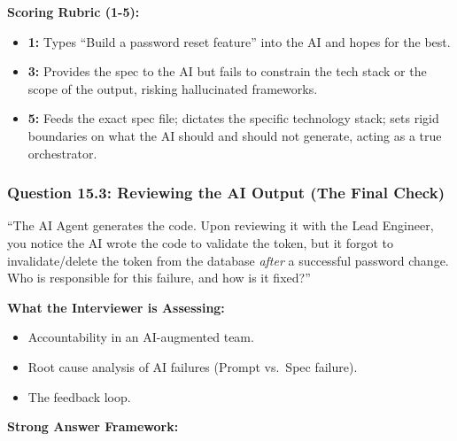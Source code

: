\documentclass[
  11pt,
  openany,
  oneside]{book}
\providecommand{\tightlist}{%
  \setlength{\itemsep}{0pt}\setlength{\parskip}{0pt}}
\begin{document}
\textbf{Scoring Rubric (1-5):}

\begin{itemize}
\tightlist
\item
  \textbf{1:} Types ``Build a password reset feature'' into the AI and
  hopes for the best.
\item
  \textbf{3:} Provides the spec to the AI but fails to constrain the
  tech stack or the scope of the output, risking hallucinated
  frameworks.
\item
  \textbf{5:} Feeds the exact spec file; dictates the specific
  technology stack; sets rigid boundaries on what the AI should and
  should not generate, acting as a true orchestrator.
\end{itemize}

\subsubsection{Question 15.3: Reviewing the AI Output (The Final
Check)}\label{question-15.3-reviewing-the-ai-output-the-final-check}

``The AI Agent generates the code. Upon reviewing it with the Lead
Engineer, you notice the AI wrote the code to validate the token, but it
forgot to invalidate/delete the token from the database \emph{after} a
successful password change. Who is responsible for this failure, and how
is it fixed?''

\textbf{What the Interviewer is Assessing:}

\begin{itemize}
\tightlist
\item
  Accountability in an AI-augmented team.
\item
  Root cause analysis of AI failures (Prompt vs.~Spec failure).
\item
  The feedback loop.
\end{itemize}

\textbf{Strong Answer Framework:}
\end{document}
